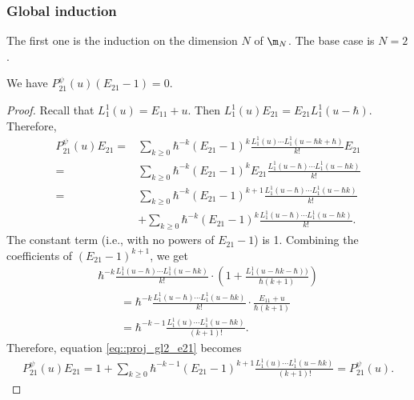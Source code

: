 	\subsubsection{Global induction}
	
	The first one is the induction on the dimension $N$ of $\m_N$. The base case is $N=2$.
	
	\begin{Proposition}
		\label{prop::gl2_proj_inv}
		We have $P_{21}^{\psi}(u) (E_{21} - 1) = 0$.
		\begin{proof}
			Recall that $L_1^1(u) = E_{11} + u$. Then
$
			L_1^1(u) E_{21} = E_{21} L_1^1(u-\hbar)$.
			Therefore,
			\begin{align}
					P_{21}^{\psi}(u) E_{21}={}& \sum\limits_{k\geq 0} \hbar^{-k} (E_{21} -1)^k \frac{L_1^1(u) \cdots L_1^1(u - \hbar k+\hbar)}{k!} E_{21} \nonumber \\
					={}& \sum\limits_{k\geq 0} \hbar^{-k} (E_{21} -1)^k E_{21} \frac{L_1^1(u-\hbar) \cdots L_1^1(u - \hbar k)}{k!} \nonumber \\
					={}& \sum\limits_{k\geq 0} \hbar^{-k} (E_{21}-1)^{k+1} \frac{L_1^1(u-\hbar) \cdots L_1^1(u - \hbar k)}{k!} \nonumber \\
					&+\sum\limits_{k\geq 0} \hbar^{-k} (E_{21}-1)^{k} \frac{L_1^1(u-\hbar) \cdots L_1^1(u - \hbar k)}{k!}.	\label{eq::proj_gl2_e21}
			\end{align}
			The constant term (i.e., with no powers of $E_{21}-1$) is 1. Combining the coefficients of $(E_{21}-1)^{k+1}$, we get
			\begin{gather*}
				\hbar^{-k} \frac{L_1^1(u-\hbar) \cdots L_1^1(u - \hbar k)}{k!} \cdot \left( 1 + \frac{L_1^1(u-\hbar k-\hbar))}{\hbar(k+1)} \right) \\
				\qquad= \hbar^{-k} \frac{L_1^1(u-\hbar) \cdots L_1^1(u - \hbar k)}{k!} \cdot \frac{E_{11} + u}{\hbar(k+1)} \\
				\qquad= \hbar^{-k-1} \frac{L_1^1(u)\cdots L_1^1(u-\hbar k)}{(k+1)!}.
			\end{gather*}
			Therefore, equation \eqref{eq::proj_gl2_e21} becomes
			\begin{align*}
				P_{21}^{\psi}(u) E_{21} = 1 + \sum\limits_{k \geq 0} \hbar^{-k-1} (E_{21}-1)^{k+1} \frac{L_1^1(u) \cdots L_1^1(u-\hbar k)}{(k+1)!} = P_{21}^{\psi}(u).\tag*{\qed}
			\end{align*}\renewcommand{\qed}{}
		\end{proof}
	\end{Proposition}
	
